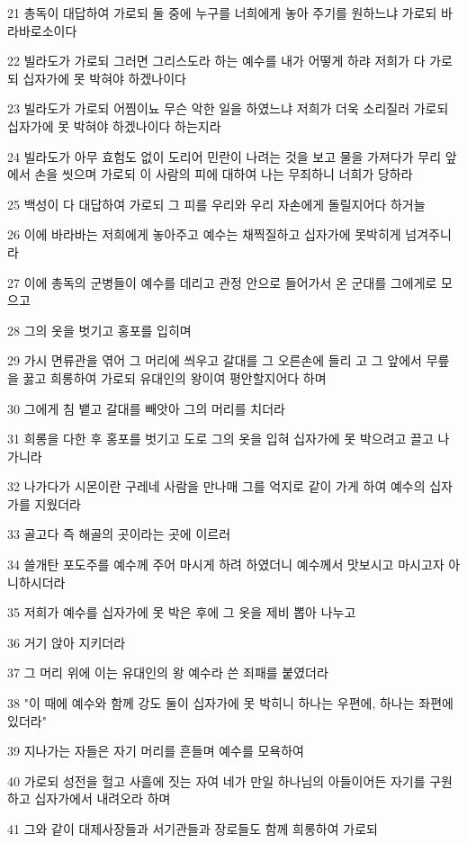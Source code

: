 \par 21 총독이 대답하여 가로되 둘 중에 누구를 너희에게 놓아 주기를 원하느냐 가로되 바라바로소이다
\par 22 빌라도가 가로되 그러면 그리스도라 하는 예수를 내가 어떻게 하랴 저희가 다 가로되 십자가에 못 박혀야 하겠나이다
\par 23 빌라도가 가로되 어찜이뇨 무슨 악한 일을 하였느냐 저희가 더욱 소리질러 가로되 십자가에 못 박혀야 하겠나이다 하는지라
\par 24 빌라도가 아무 효험도 없이 도리어 민란이 나려는 것을 보고 물을 가져다가 무리 앞에서 손을 씻으며 가로되 이 사람의 피에 대하여 나는 무죄하니 너희가 당하라
\par 25 백성이 다 대답하여 가로되 그 피를 우리와 우리 자손에게 돌릴지어다 하거늘
\par 26 이에 바라바는 저희에게 놓아주고 예수는 채찍질하고 십자가에 못박히게 넘겨주니라
\par 27 이에 총독의 군병들이 예수를 데리고 관정 안으로 들어가서 온 군대를 그에게로 모으고
\par 28 그의 옷을 벗기고 홍포를 입히며
\par 29 가시 면류관을 엮어 그 머리에 씌우고 갈대를 그 오른손에 들리 고 그 앞에서 무릎을 꿇고 희롱하여 가로되 유대인의 왕이여 평안할지어다 하며
\par 30 그에게 침 뱉고 갈대를 빼앗아 그의 머리를 치더라
\par 31 희롱을 다한 후 홍포를 벗기고 도로 그의 옷을 입혀 십자가에 못 박으려고 끌고 나가니라
\par 32 나가다가 시몬이란 구레네 사람을 만나매 그를 억지로 같이 가게 하여 예수의 십자가를 지웠더라
\par 33 골고다 즉 해골의 곳이라는 곳에 이르러
\par 34 쓸개탄 포도주를 예수께 주어 마시게 하려 하였더니 예수께서 맛보시고 마시고자 아니하시더라
\par 35 저희가 예수를 십자가에 못 박은 후에 그 옷을 제비 뽑아 나누고
\par 36 거기 앉아 지키더라
\par 37 그 머리 위에 이는 유대인의 왕 예수라 쓴 죄패를 붙였더라
\par 38 "이 때에 예수와 함께 강도 둘이 십자가에 못 박히니 하나는 우편에, 하나는 좌편에 있더라"
\par 39 지나가는 자들은 자기 머리를 흔들며 예수를 모욕하여
\par 40 가로되 성전을 헐고 사흘에 짓는 자여 네가 만일 하나님의 아들이어든 자기를 구원하고 십자가에서 내려오라 하며
\par 41 그와 같이 대제사장들과 서기관들과 장로들도 함께 희롱하여 가로되
